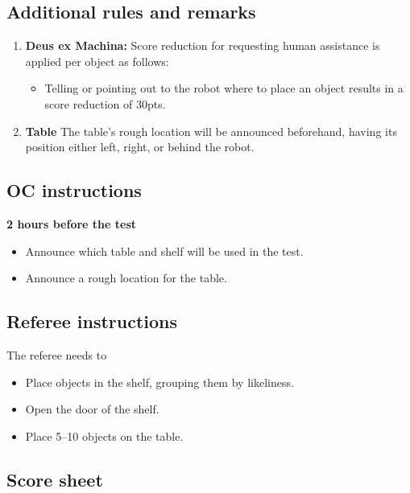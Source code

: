 %
%
\subsection*{Additional rules and remarks}
\begin{enumerate}
		\item \textbf{Deus ex Machina:} Score reduction for requesting human assistance is applied per object as follows:
	\begin{itemize}[nosep]
		\item Telling or pointing out to the robot where to place an object results in a score reduction of 30pts.
	\end{itemize}

	\item \textbf{Table} The table's rough location will be announced beforehand, having its position either left, right, or behind the robot.
\end{enumerate}

\newpage
\subsection*{OC instructions}

\textbf{2 hours before the test}
\begin{itemize}
	\item Announce which table and shelf will be used in the test.
	\item Announce a rough location for the table.
\end{itemize}

\subsection*{Referee instructions}
The referee needs to
\begin{itemize}
	\item Place objects in the shelf, grouping them by likeliness.
	\item Open the door of the shelf.
	\item Place 5--10 objects on the table.
\end{itemize}


\newpage
\subsection*{Score sheet}



